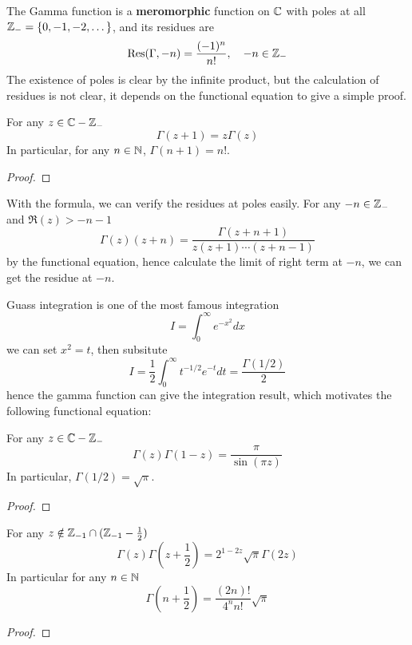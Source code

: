 The Gamma function is a \textbf{meromorphic} function on \(\mathbb{C}\) with poles at all \(\mathbb{Z}_{-} =\{0,-1,-2,\dots\} \), and its residues are
\[\mathrm{Res}(\Gamma,-n) = \frac{(-1)^n}{n!}, \quad -n \in \mathbb{Z}_{-}\]
The existence of poles is clear by the infinite product, but the calculation of residues is not clear, it depends on the functional equation to give a simple proof.

\begin{proposition}
    For any \(z \in \mathbb{C} - \mathbb{Z}_{-}\)
    \[\Gamma(z+1) = z\Gamma(z)\]
    In particular, for any \(n \in \mathbb{N}\), \(\Gamma(n+1) = n!\).
\end{proposition}

\begin{proof}
    
\end{proof}

\begin{remark}
    With the formula, we can verify the residues at poles easily. For any \(-n \in \mathbb{Z}_{-}\) and \(\Re(z) >-n-1\)
    \[\Gamma(z)(z+n) = \frac{\Gamma(z+n+1)}{z(z+1)\cdots(z+n-1)}\]
    by the functional equation, hence calculate the limit of right term at \(-n\), we can get the residue at \(-n\).
\end{remark}


Guass integration is one of the most famous integration 
\[I = \int_{0}^{\infty}e^{-x^2} dx \]
we can set \(x^2=t\), then subsitute 
\[I = \frac{1}{2} \int_{0}^{\infty} t^{-1/2}e^{-t} dt = \frac{\Gamma(1/2)}{2} \]
hence the gamma function can give the integration result, which motivates the following functional equation:
\begin{proposition}
    For any \(z \in \mathbb{C} - \mathbb{Z}_{-}\)
    \[\Gamma(z)\Gamma(1-z) = \frac{\pi}{\sin(\pi z)}\]
    In particular, \(\Gamma(1/2) = \sqrt{\pi}\).
\end{proposition}
\begin{proof}
    
\end{proof}
\begin{proposition}
    For any \(z \notin \mathbb{Z}_{-1}\cap(\mathbb{Z}_{-1}-\frac{1}{2})\)
    \[\Gamma(z)\Gamma(z+\frac{1}{2}) = 2^{1-2z}\sqrt{\pi}\Gamma(2z)\]
    In particular for any \(n \in \mathbb{N}\)
    \[\Gamma(n+\frac{1}{2}) = \frac{(2n)!}{4^n n!}\sqrt{\pi}\]
\end{proposition}
\begin{proof}
    
\end{proof}

